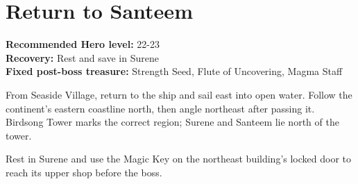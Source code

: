 \documentclass[
  american,
  10pt,
  letterpaper,
  oneside,
  open=any]{scrreprt}
\begin{document}
\section{Return to Santeem}\label{return-to-santeem}

\textbf{Recommended Hero level:} 22-23\\
\textbf{Recovery:} Rest and save in Surene\\
\textbf{Fixed post-boss treasure:} Strength Seed, Flute of Uncovering,
Magma Staff

From Seaside Village, return to the ship and sail east into open water.
Follow the continent's eastern coastline north, then angle northeast
after passing it. Birdsong Tower marks the correct region; Surene and
Santeem lie north of the tower.

Rest in Surene and use the Magic Key on the northeast building's locked
door to reach its upper shop before the boss.
\end{document}
